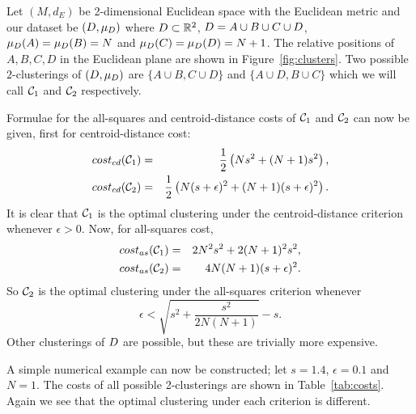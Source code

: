 Let $(M,d_E)$ be 2-dimensional Euclidean space with the Euclidean metric and
our dataset be $(D, \mu_{D})$ where $D \subset \mathbb{R}^2$,
$D = A \cup B \cup C \cup D$, $\mu_{D}(A)=\mu_{D}(B)=N$ and
$\mu_{D}(C)=\mu_{D}(D)=N+1$.  The relative positions of $A,B,C,D$ in
the Euclidean plane are shown in Figure~\ref{fig:clusters}.  Two possible
$2$-clusterings of $(D,\mu_{D})$ are $\{A \cup B,C \cup D\}$ and $\{A
\cup D,B \cup C\}$ which we will call $\mathcal{C}_1$ and $\mathcal{C}_2$ respectively.

Formulae for the all-squares and centroid-distance costs of $\mathcal{C}_1$ and
$\mathcal{C}_2$ can now be given, first for centroid-distance cost:
\begin{eqnarray*}
  cost_{cd}(\mathcal{C}_1) &=& \frac{1}{2}\left(Ns^2+(N+1)s^2\right), \\
  cost_{cd}(\mathcal{C}_2) &=& \frac{1}{2}\left(N(s+\epsilon)^2+(N+1)(s+\epsilon)^2\right).
\end{eqnarray*}
It is clear that $\mathcal{C}_1$ is the optimal clustering under the
centroid-distance criterion whenever $\epsilon > 0$.  Now, for all-squares
cost,
\begin{eqnarray*}
  cost_{as}(\mathcal{C}_1) &=& 2N^2s^2+2(N+1)^2s^2, \\
  cost_{as}(\mathcal{C}_2) &=& 4N(N+1)(s+\epsilon)^2.
\end{eqnarray*}
So $\mathcal{C}_2$ is the optimal clustering under the all-squares criterion
whenever
\begin{equation*}
  \epsilon < \sqrt{s^2 + \frac{s^2}{2N(N+1)}} - s.
\end{equation*}
Other clusterings of $D$ are possible, but these are trivially more
expensive.

A simple numerical example can now be constructed; let $s=1.4$, $\epsilon=0.1$
and $N=1$.  The costs of all possible 2-clusterings are shown in
Table~\ref{tab:costs}.  Again we see that the optimal clustering under each
criterion is different.


